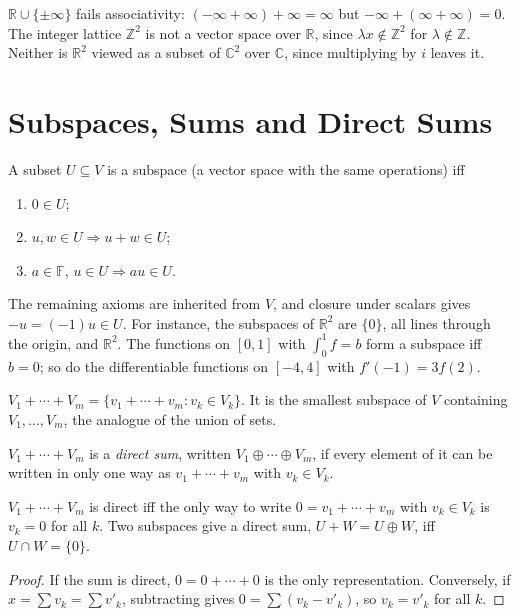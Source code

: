 \begin{example}
$\mathbb{R}\cup\{\pm\infty\}$ fails associativity: $(-\infty+\infty)+\infty = \infty$ but $-\infty+(\infty+\infty) = 0$. The integer lattice $\mathbb{Z}^2$ is not a vector space over $\mathbb{R}$, since $\lambda x\notin\mathbb{Z}^2$ for $\lambda\notin\mathbb{Z}$. Neither is $\mathbb{R}^2$ viewed as a subset of $\mathbb{C}^2$ over $\mathbb{C}$, since multiplying by $i$ leaves it.
\end{example}

\section{Subspaces, Sums and Direct Sums}

\begin{theorem}
A subset $U\subseteq V$ is a subspace (a vector space with the same operations) iff
\begin{enumerate}
    \item $0\in U$;
    \item $u,w\in U\Rightarrow u+w\in U$;
    \item $a\in\mathbb{F}$, $u\in U\Rightarrow au\in U$.
\end{enumerate}
\end{theorem}
The remaining axioms are inherited from $V$, and closure under scalars gives $-u = (-1)u\in U$. For instance, the subspaces of $\mathbb{R}^2$ are $\{0\}$, all lines through the origin, and $\mathbb{R}^2$. The functions on $[0,1]$ with $\int_0^1 f = b$ form a subspace iff $b = 0$; so do the differentiable functions on $[-4,4]$ with $f'(-1) = 3f(2)$.

\begin{definition}
$V_1+\cdots+V_m = \{v_1+\cdots+v_m : v_k\in V_k\}$. It is the smallest subspace of $V$ containing $V_1,\ldots,V_m$, the analogue of the union of sets.
\end{definition}

\begin{definition}
$V_1+\cdots+V_m$ is a \emph{direct sum}, written $V_1\oplus\cdots\oplus V_m$, if every element of it can be written in only one way as $v_1+\cdots+v_m$ with $v_k\in V_k$.
\end{definition}

\begin{theorem}
$V_1+\cdots+V_m$ is direct iff the only way to write $0 = v_1+\cdots+v_m$ with $v_k\in V_k$ is $v_k = 0$ for all $k$. Two subspaces give a direct sum, $U+W = U\oplus W$, iff $U\cap W = \{0\}$.
\end{theorem}
\begin{proof}
If the sum is direct, $0 = 0+\cdots+0$ is the only representation. Conversely, if $x = \sum v_k = \sum v'_k$, subtracting gives $0 = \sum(v_k - v'_k)$, so $v_k = v'_k$ for all $k$.
\end{proof}

